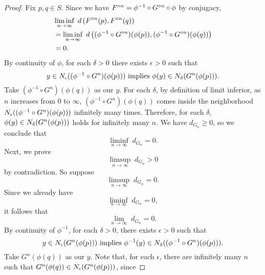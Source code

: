 \documentclass[12pt,draft,twoside]{book}
\begin{document}
\begin{theorem}
\begin{proof}
    Fix $p,q \in S$.
    Since we have $F^{\circ n} = \phi^{-1}\circ G^{\circ n}\circ\phi$ by conjugacy,
    \begin{align*}
      &\liminf\limits_{n \to \infty}\; d\left( F^{\circ n}(p) , F^{\circ n}(q) \right) \\
      &= \liminf\limits_{n \to \infty}\; d\left( (\phi^{-1}\circ G^{\circ n})(\phi(p)) , (\phi^{-1}\circ G^{\circ n})(\phi(q)) \right) \\
      &= 0.
    \end{align*}
  By continuity of $\phi$, for each $\delta > 0$ there exists $\epsilon>0$ such that 
  \begin{equation*}
    y \in N_{\epsilon}((\phi^{-1}\circ G^n)(\phi(p))) \mbox{ implies } \phi(y) \in N_{\delta}(G^n(\phi(p))).
  \end{equation*}
  Take $(\phi^{-1}\circ G^n)(\phi(q))$ as our $y$.
  For each $\delta$, by definition of limit inferior, as $n$ increases from $0$ to $\infty$, $(\phi^{-1}\circ G^n)(\phi(q))$ comes inside the neighborhood $N_{\epsilon}((\phi^{-1}\circ G^n)(\phi(p)))$ infinitely many times.
  Therefore, for each $\delta$, $\phi(y) \in N_{\delta}(G^n(\phi(p)))$ holds for infinitely many $n$.
  We have $d_{G_n} \geq 0$, so we conclude that
  \begin{equation*}
    \liminf\limits_{n \to \infty}\; d_{G_n} = 0.
  \end{equation*}
  Next, we prove
  \begin{equation*}
    \limsup\limits_{n \to \infty}\; d_{G_n} > 0
  \end{equation*}
  by contradiction.
  So suppose
  \begin{equation*}
    \limsup\limits_{n \to \infty}\; d_{G_n} = 0.
  \end{equation*}
  Since we already have
  \begin{equation*}
    \liminf\limits_{n \to \infty}\; d_{G_n} = 0,
  \end{equation*}
  it follows that 
  \begin{equation*}
    \lim\limits_{n \to \infty}\; d_{G_n} = 0.
  \end{equation*}
  By continuity of $\phi^{-1}$, for each $\delta > 0$, there exists $\epsilon > 0$ such that
  \begin{equation*}
    y \in N_{\epsilon}(G^n(\phi(p))) \mbox{ implies } \phi^{-1}(y) \in N_{\delta}((\phi^{-1} \circ G^n)(\phi(p))).
  \end{equation*}
  Take $G^n(\phi(q))$ as our $y$.
  Note that, for each $\epsilon$, there are infinitely many $n$ such that $G^n(\phi(q)) \in N_{\epsilon}(G^n(\phi(p)))$, since 

\end{proof}
\end{theorem}
\end{document}
